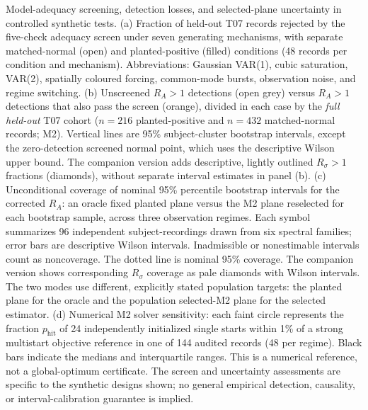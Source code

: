 \caption{Model-adequacy screening, detection losses, and selected-plane uncertainty in controlled synthetic tests. (a) Fraction of held-out T07 records rejected by the five-check adequacy screen under seven generating mechanisms, with separate matched-normal (open) and planted-positive (filled) conditions (48 records per condition and mechanism). Abbreviations: Gaussian VAR(1), cubic saturation, VAR(2), spatially coloured forcing, common-mode bursts, observation noise, and regime switching. (b) Unscreened $R_A>1$ detections (open grey) versus $R_A>1$ detections that also pass the screen (orange), divided in each case by the \emph{full held-out} T07 cohort ($n=216$ planted-positive and $n=432$ matched-normal records; M2). Vertical lines are 95\% subject-cluster bootstrap intervals, except the zero-detection screened normal point, which uses the descriptive Wilson upper bound. The companion version adds descriptive, lightly outlined $R_\sigma>1$ fractions (diamonds), without separate interval estimates in panel (b). (c) Unconditional coverage of nominal 95\% percentile bootstrap intervals for the corrected $R_A$: an oracle fixed planted plane versus the M2 plane reselected for each bootstrap sample, across three observation regimes. Each symbol summarizes 96 independent subject-recordings drawn from six spectral families; error bars are descriptive Wilson intervals. Inadmissible or nonestimable intervals count as noncoverage. The dotted line is nominal 95\% coverage. The companion version shows corresponding $R_\sigma$ coverage as pale diamonds with Wilson intervals. The two modes use different, explicitly stated population targets: the planted plane for the oracle and the population selected-M2 plane for the selected estimator. (d) Numerical M2 solver sensitivity: each faint circle represents the fraction $p_{\mathrm{hit}}$ of 24 independently initialized single starts within 1\% of a strong multistart objective reference in one of 144 audited records (48 per regime). Black bars indicate the medians and interquartile ranges. This is a numerical reference, not a global-optimum certificate. The screen and uncertainty assessments are specific to the synthetic designs shown; no general empirical detection, causality, or interval-calibration guarantee is implied.}